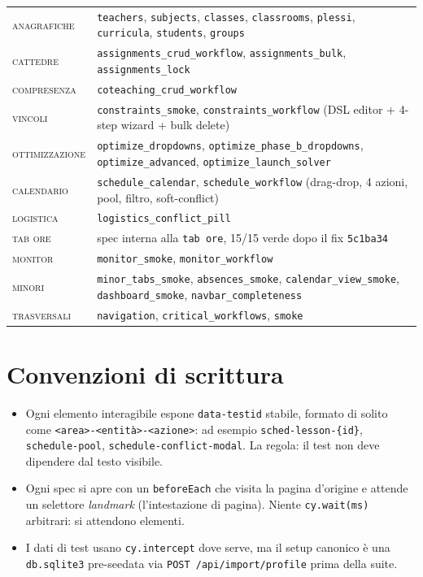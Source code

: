 \begin{statsbox}[title={La mappa della suite Cypress (maggio MMXXVI)}]
\begin{tabular}{ll}
  \textsc{anagrafiche} &
    \texttt{teachers}, \texttt{subjects}, \texttt{classes},
    \texttt{classrooms}, \texttt{plessi}, \texttt{curricula},
    \texttt{students}, \texttt{groups} \\
  \textsc{cattedre} &
    \texttt{assignments\_crud\_workflow},
    \texttt{assignments\_bulk}, \texttt{assignments\_lock} \\
  \textsc{compresenza} & \texttt{coteaching\_crud\_workflow} \\
  \textsc{vincoli} &
    \texttt{constraints\_smoke}, \texttt{constraints\_workflow}
    (DSL editor + 4-step wizard + bulk delete) \\
  \textsc{ottimizzazione} &
    \texttt{optimize\_dropdowns},
    \texttt{optimize\_phase\_b\_dropdowns},
    \texttt{optimize\_advanced},
    \texttt{optimize\_launch\_solver} \\
  \textsc{calendario} &
    \texttt{schedule\_calendar},
    \texttt{schedule\_workflow}
    (drag-drop, 4 azioni, pool, filtro, soft-conflict) \\
  \textsc{logistica} &
    \texttt{logistics\_conflict\_pill} \\
  \textsc{tab ore} &
    spec interna alla \texttt{tab ore}, 15/15 verde dopo il fix
    \texttt{5c1ba34} \\
  \textsc{monitor} & \texttt{monitor\_smoke},
    \texttt{monitor\_workflow} \\
  \textsc{minori} &
    \texttt{minor\_tabs\_smoke}, \texttt{absences\_smoke},
    \texttt{calendar\_view\_smoke}, \texttt{dashboard\_smoke},
    \texttt{navbar\_completeness} \\
  \textsc{trasversali} &
    \texttt{navigation}, \texttt{critical\_workflows},
    \texttt{smoke} \\
\end{tabular}
\end{statsbox}

\section{Convenzioni di scrittura}

\begin{itemize}
  \item Ogni elemento interagibile espone \texttt{data-testid}
    stabile, formato di solito come
    \texttt{<area>-<entit\`a>-<azione>}: ad esempio
    \texttt{sched-lesson-\{id\}},
    \texttt{schedule-pool},
    \texttt{schedule-conflict-modal}. La regola: il test non
    deve dipendere dal testo visibile.
  \item Ogni spec si apre con un \texttt{beforeEach} che
    visita la pagina d'origine e attende un selettore
    \emph{landmark} (l'intestazione di pagina). Niente
    \texttt{cy.wait(ms)} arbitrari: si attendono elementi.
  \item I dati di test usano \texttt{cy.intercept} dove serve,
    ma il setup canonico \`e una \texttt{db.sqlite3} pre-seedata
    via \texttt{POST /api/import/profile} prima della suite.
\end{itemize}


